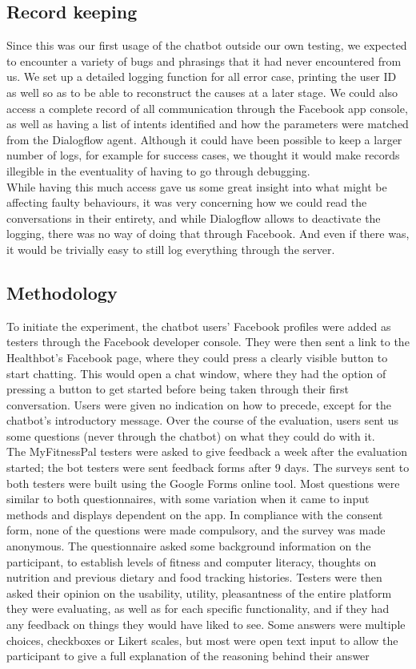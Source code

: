 \subsection{Record keeping}
Since this was our first usage of the chatbot outside our own testing, we expected to encounter a variety of bugs and phrasings that it had never encountered from us. We set up a detailed logging function for all error case, printing the user ID as well so as to be able to reconstruct the causes at a later stage. We could also access a complete record of all communication through the Facebook app console, as well as having a list of intents identified and how the parameters were matched from the Dialogflow agent. Although it could have been possible to keep a larger number of logs, for example for success cases, we thought it would make records illegible in the eventuality of having to go through debugging.\\
While having this much access gave us some great insight into what might be affecting faulty behaviours, it was very concerning how we could read the conversations in their entirety, and while Dialogflow allows to deactivate the logging, there was no way of doing that through Facebook. And even if there was, it would be trivially easy to still log everything through the server.
\subsection{Methodology}
To initiate the experiment, the chatbot users' Facebook profiles were added as testers through the Facebook developer console. They were then sent a link to the Healthbot's Facebook page, where they could press a clearly visible button to start chatting. This would open a chat window, where they had the option of pressing a button to get started before being taken through their first conversation. Users were given no indication on how to precede, except for the chatbot's introductory message. Over the course of the evaluation, users sent us some questions (never through the chatbot) on what they could do with it. \\
The MyFitnessPal testers were asked to give feedback a week after the evaluation started; the bot testers were sent feedback forms after 9 days.
The surveys sent to both testers were built using the Google Forms online tool. Most questions were similar to both questionnaires, with some variation when it came to input methods and displays dependent on the app. In compliance with the consent form, none of the questions were made compulsory, and the survey was made anonymous.
The questionnaire asked some background information on the participant, to establish levels of fitness and computer literacy, thoughts on nutrition and previous dietary and food tracking histories.
Testers were then asked their opinion on the usability, utility, pleasantness of the entire platform they were evaluating, as well as for each specific functionality, and if they had any feedback on things they would have liked to see. Some answers were multiple choices, checkboxes or Likert scales, but most were open text input to allow the participant to give a full explanation of the reasoning behind their answer
